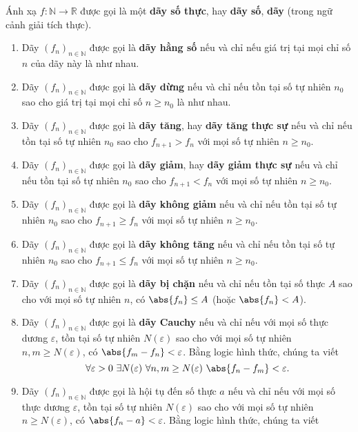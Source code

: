 \begin{definition}
    Ánh xạ $f: \mathbb{N}\to \mathbb{R}$ được gọi là một \textbf{dãy số thực}, hay \textbf{dãy số}, \textbf{dãy} (trong ngữ cảnh giải tích thực).
    \begin{enumerate}[label={(\roman*)}]
        \item Dãy ${(f_{n})}_{n\in\mathbb{N}}$ được gọi là \textbf{dãy hằng số} nếu và chỉ nếu giá trị tại mọi chỉ số $n$ của dãy này là như nhau.
        \item Dãy ${(f_{n})}_{n\in\mathbb{N}}$ được gọi là \textbf{dãy dừng} nếu và chỉ nếu tồn tại số tự nhiên $n_{0}$ sao cho giá trị tại mọi chỉ số $n\geq n_{0}$ là như nhau.
        \item Dãy ${(f_{n})}_{n\in\mathbb{N}}$ được gọi là \textbf{dãy tăng}, hay \textbf{dãy tăng thực sự} nếu và chỉ nếu tồn tại số tự nhiên $n_{0}$ sao cho $f_{n+1} > f_{n}$ với mọi số tự nhiên $n\geq n_{0}$.
        \item Dãy ${(f_{n})}_{n\in\mathbb{N}}$ được gọi là \textbf{dãy giảm}, hay \textbf{dãy giảm thực sự} nếu và chỉ nếu tồn tại số tự nhiên $n_{0}$ sao cho $f_{n+1} < f_{n}$ với mọi số tự nhiên $n\geq n_{0}$.
        \item Dãy ${(f_{n})}_{n\in\mathbb{N}}$ được gọi là \textbf{dãy không giảm} nếu và chỉ nếu tồn tại số tự nhiên $n_{0}$ sao cho $f_{n+1}\geq f_{n}$ với mọi số tự nhiên $n\geq n_{0}$.
        \item Dãy ${(f_{n})}_{n\in\mathbb{N}}$ được gọi là \textbf{dãy không tăng} nếu và chỉ nếu tồn tại số tự nhiên $n_{0}$ sao cho $f_{n+1}\leq f_{n}$ với mọi số tự nhiên $n\geq n_{0}$.
        \item Dãy ${(f_{n})}_{n\in\mathbb{N}}$ được gọi là \textbf{dãy bị chặn} nếu và chỉ nếu tồn tại số thực $A$ sao cho với mọi số tự nhiên $n$, có $\abs{f_{n}}\leq A$ (hoặc $\abs{f_{n}} < A$).
        \item Dãy ${(f_{n})}_{n\in\mathbb{N}}$ được gọi là \textbf{dãy Cauchy} nếu và chỉ nếu với mọi số thực dương $\varepsilon$, tồn tại số tự nhiên $N(\varepsilon)$ sao cho với mọi số tự nhiên $n, m\geq N(\varepsilon)$, có $\abs{f_{m} - f_{n}} < \varepsilon$. Bằng logic hình thức, chúng ta viết
              \[
                  \forall \varepsilon > 0\ \exists N(\varepsilon)\ \forall n, m\geq N(\varepsilon)\ \abs{f_{n} - f_{m}} < \varepsilon.
              \]
        \item Dãy ${(f_{n})}_{n\in\mathbb{N}}$ được gọi là hội tụ đến số thực $a$ nếu và chỉ nếu với mọi số thực dương $\varepsilon$, tồn tại số tự nhiên $N(\varepsilon)$ sao cho với mọi số tự nhiên $n\geq N(\varepsilon)$, có $\abs{f_{n} - a} < \varepsilon$. Bằng logic hình thức, chúng ta viết

\end{enumerate}
\end{definition}
